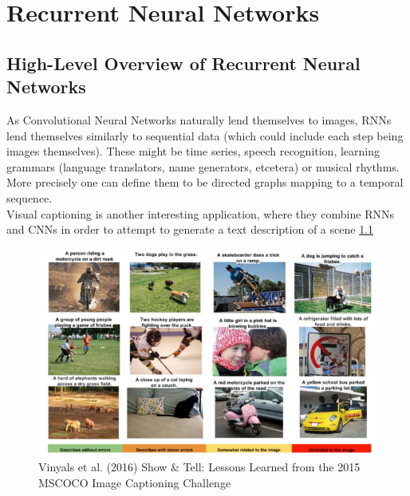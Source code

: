 \chapter{Recurrent Neural Networks}

\section{ High-Level Overview of Recurrent Neural Networks }

As Convolutional Neural Networks naturally lend themselves to images, RNNs lend themselves similarly to sequential data (which could include each step being images themselves). These might be time series, speech recognition, learning grammars (language translators, name generators, etcetera) or musical rhythms. More precisely one can define them to be directed graphs mapping to a temporal sequence.\\

Visual captioning \cite{DBLP:journals/corr/VinyalsTBE16} is another interesting application, where they combine RNNs and CNNs in order to attempt to generate a text description of a scene \ref{fig:visual_caption}

\begin{figure}
    \centering
    \includegraphics[width=\textwidth]{labs/06/images/image_captioning.png}
    \caption{Vinyals et al. (2016) Show \& Tell: Lessons Learned from the 2015 MSCOCO Image Captioning Challenge}
    \label{fig:visual_caption}
\end{figure}

